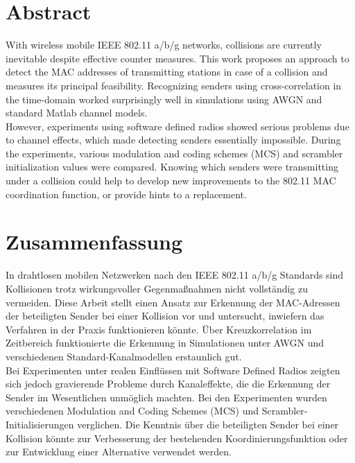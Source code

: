 

\begingroup
\let\clearpage\relax
\let\cleardoublepage\relax
\let\cleardoublepage\relax

\chapter*{Abstract}

With wireless mobile IEEE 802.11 a/b/g networks, collisions are currently inevitable despite effective counter measures. This work proposes an approach to detect the MAC addresses of transmitting stations in case of a collision and measures its principal feasibility. Recognizing senders using cross-correlation in the time-domain worked surprisingly well in simulations using AWGN and standard Matlab channel models.\\

\noindent However, experiments using software defined radios showed serious problems due to channel effects, which made detecting senders essentially impossible. During the experiments, various modulation and coding schemes (MCS) and scrambler initialization values were compared. Knowing which senders were transmitting under a collision could help to develop new improvements to the 802.11 MAC coordination function, or provide hints to a replacement.



\vfill
{}
\chapter*{Zusammenfassung}

In drahtlosen mobilen Netzwerken nach den IEEE 802.11 a/b/g Standards sind Kollisionen trotz wirkungsvoller Gegenmaßnahmen nicht vollständig zu vermeiden. Diese Arbeit stellt einen Ansatz zur Erkennung der MAC-Adressen der beteiligten Sender bei einer Kollision vor und untersucht, inwiefern das Verfahren in der Praxis funktionieren könnte. Über Kreuzkorrelation im Zeitbereich funktionierte die Erkennung in Simulationen unter AWGN und verschiedenen Standard-Kanalmodellen erstaunlich gut.\\

\noindent Bei Experimenten unter realen Einflüssen mit Software Defined Radios zeigten sich jedoch gravierende Probleme durch Kanaleffekte, die die Erkennung der Sender im Wesentlichen unmöglich machten. Bei den Experimenten wurden verschiedenen Modulation and Coding Schemes (MCS) und Scrambler-Initialisierungen verglichen. Die Kenntnis über die beteiligten Sender bei einer Kollision könnte zur Verbesserung der bestehenden Koordinierungsfunktion oder zur Entwicklung einer Alternative verwendet werden.


\endgroup
\vfill
